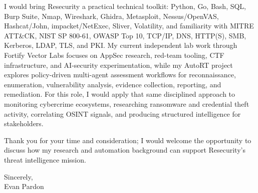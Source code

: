 \documentclass[letterpaper,11pt]{article}
\begin{document}
I would bring Resecurity a practical technical toolkit: Python, Go, Bash, SQL, Burp Suite, Nmap, Wireshark, Ghidra, Metasploit, Nessus/OpenVAS, Hashcat/John, impacket/NetExec, Sliver, Volatility, and familiarity with MITRE ATT\&CK, NIST SP 800-61, OWASP Top 10, TCP/IP, DNS, HTTP(S), SMB, Kerberos, LDAP, TLS, and PKI. My current independent lab work through Fortify Vector Labs focuses on AppSec research, red-team tooling, CTF infrastructure, and AI-security experimentation, while my AutoRT project explores policy-driven multi-agent assessment workflows for reconnaissance, enumeration, vulnerability analysis, evidence collection, reporting, and remediation. For this role, I would apply that same disciplined approach to monitoring cybercrime ecosystems, researching ransomware and credential theft activity, correlating OSINT signals, and producing structured intelligence for stakeholders.

Thank you for your time and consideration; I would welcome the opportunity to discuss how my research and automation background can support Resecurity’s threat intelligence mission.

Sincerely,\\
Evan Pardon
\end{document}
